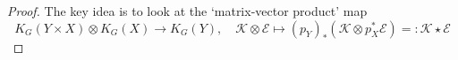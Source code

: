 \documentclass[11pt]{amsart}
\theoremstyle{definition}
\newtheorem{remark}[dummy]{Remark}
\newcommand{\Ec}{\mathcal{E}}
\newcommand{\Oc}{\mathcal{O}}
\newcommand{\Coh}{\mathrm{Coh}}
\numberwithin{equation}{subsection}
\numberwithin{figure}{subsection}
\begin{document}
\begin{proof}
The key idea is to look at the `matrix-vector product' map
$$
K_G(Y\times X)\otimes K_G(X)\rightarrow K_G(Y), \quad \mathcal{K}\otimes \Ec \mapsto (p_Y)_*(\mathcal{K}\otimes p_X^*\Ec)=:\mathcal{K}\star\Ec
$$
%



\end{proof}
\end{document}
